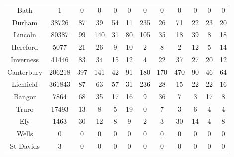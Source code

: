 \begin{tabular}{c|ccccccccccc}
Bath & 1 & 0 & 0 & 0 & 0 & 0 & 0 & 0 & 0 & 0 & 0 \\
Durham & 38726 & 87 & 39 & 54 & 11 & 235 & 26 & 71 & 22 & 23 & 20 \\
Lincoln & 80387 & 99 & 140 & 31 & 80 & 105 & 35 & 18 & 39 & 8 & 18 \\
Hereford & 5077 & 21 & 26 & 9 & 10 & 2 & 8 & 2 & 12 & 5 & 14 \\
Inverness & 41446 & 83 & 34 & 15 & 12 & 4 & 22 & 37 & 27 & 20 & 12 \\
Canterbury & 206218 & 397 & 141 & 42 & 91 & 180 & 170 & 470 & 90 & 46 & 64 \\
Lichfield & 361843 & 87 & 63 & 57 & 31 & 236 & 28 & 15 & 22 & 22 & 16 \\
Bangor & 7864 & 68 & 35 & 17 & 16 & 9 & 36 & 7 & 3 & 17 & 8 \\
Truro & 17493 & 13 & 8 & 5 & 19 & 0 & 7 & 3 & 6 & 4 & 4 \\
Ely & 1463 & 30 & 12 & 8 & 9 & 2 & 3 & 30 & 14 & 4 & 8 \\
Wells & 0 & 0 & 0 & 0 & 0 & 0 & 0 & 0 & 0 & 0 & 0 \\
St Davids & 3 & 0 & 0 & 0 & 0 & 0 & 0 & 0 & 0 & 0 & 0 \\
\end{tabular}
